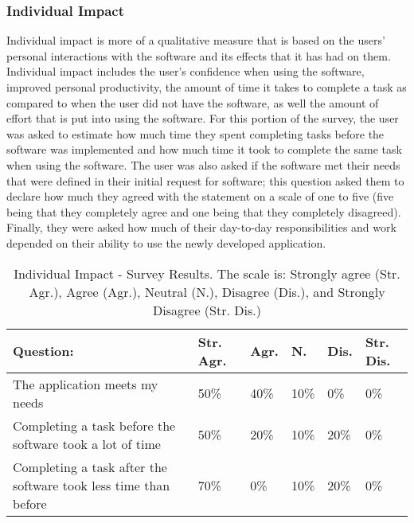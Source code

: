 \subsubsection{Individual Impact}
Individual impact is more of a qualitative measure that is based on the users' personal interactions with the software and its effects that it has had on them. Individual impact includes the user's confidence when using the software, improved personal productivity, the amount of time it takes to complete a task as compared to when the user did not have the software, as well the amount of effort that is put into using the software. For this portion of the survey, the user was asked to estimate how much time they spent completing tasks before the software was implemented and how much time it took to complete the same task when using the software. The user was also asked if the software met their needs that were defined in their initial request for software; this question asked them to declare how much they agreed with the statement on a scale of one to five (five being that they completely agree and one being that they  completely disagreed). Finally, they were asked how much of their day-to-day responsibilities and work depended on their ability to use the newly developed application.

\begin{table}
\caption{Individual Impact - Survey Results. The scale is: Strongly agree (Str. Agr.), Agree (Agr.), Neutral (N.), Disagree (Dis.), and Strongly Disagree (Str. Dis.)}
\label{table:usersatisfaction}
\begin{tabular}{p{2.6cm}p{.75cm}p{.75cm}p{.75cm}p{.75cm}p{.75cm}}
Question: & Str. Agr. & Agr. & N. & Dis. & Str. Dis. \\
 \hline
The application meets my needs & 50\% & 40\% & 10\% & 0\% & 0\% \\
Completing a task before the software took a lot of time & 50\% & 20\% & 10\% & 20\% & 0\% \\
Completing a task after the software took less time than before & 70\% & 0\% & 10\% & 20\% & 0\% \\
\end{tabular}
\end{table}


